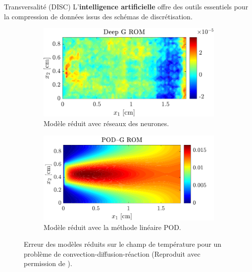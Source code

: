 \documentclass[aspectratio=169, french]{beamer}
\begin{document}
\begin{frame}{Transversalité (DISC)}
	L'\textbf{intelligence artificielle} offre des outils essentiels pour la compression de données issus des schémas de discrétisation.
	
	\begin{figure}[t]
		\begin{subfigure}[t]{0.48\textwidth}
			\includegraphics[width=\columnwidth]{DGROM_T_param1.pdf} 
			\caption*{Modèle réduit avec réseaux des neurones.}
		\end{subfigure}\hfill
		\begin{subfigure}[t]{0.48\textwidth}
			\includegraphics[width=\columnwidth]{GROM_T_param1.pdf}%
			\caption*{Modèle réduit avec la méthode linéaire POD.}
		\end{subfigure}
		\caption*{Erreur des modèles réduits sur le champ de température pour un problème de convection-diffusion-réaction (Reproduit avec permission de \cite{lee2020}).}%
	\end{figure}
\end{frame}
\end{document}
